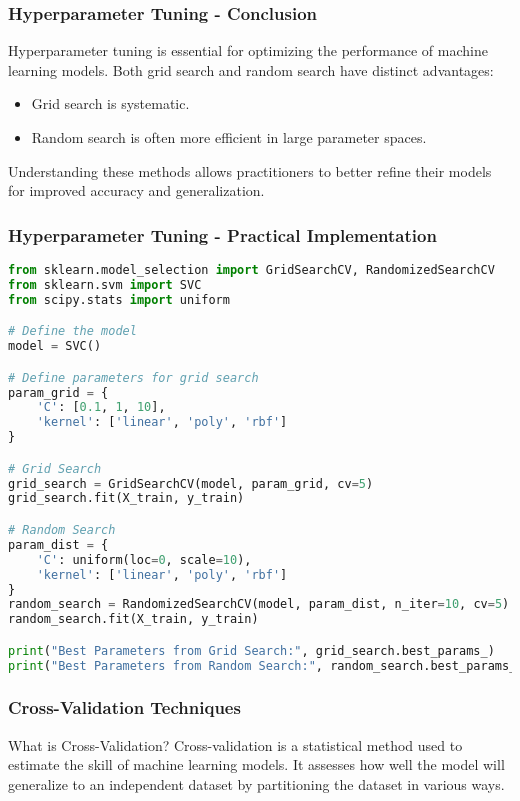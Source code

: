 \documentclass[aspectratio=169]{beamer}
\begin{document}
\begin{frame}[fragile]
    \frametitle{Hyperparameter Tuning - Conclusion}
    Hyperparameter tuning is essential for optimizing the performance of machine learning models. 
    Both grid search and random search have distinct advantages: 
    \begin{itemize}
        \item Grid search is systematic.
        \item Random search is often more efficient in large parameter spaces.
    \end{itemize}
    Understanding these methods allows practitioners to better refine their models for improved accuracy and generalization.
\end{frame}

\begin{frame}[fragile]
    \frametitle{Hyperparameter Tuning - Practical Implementation}
    \begin{lstlisting}[language=Python]
from sklearn.model_selection import GridSearchCV, RandomizedSearchCV
from sklearn.svm import SVC
from scipy.stats import uniform

# Define the model
model = SVC()

# Define parameters for grid search
param_grid = {
    'C': [0.1, 1, 10],
    'kernel': ['linear', 'poly', 'rbf']
}

# Grid Search
grid_search = GridSearchCV(model, param_grid, cv=5)
grid_search.fit(X_train, y_train)

# Random Search
param_dist = {
    'C': uniform(loc=0, scale=10),
    'kernel': ['linear', 'poly', 'rbf']
}
random_search = RandomizedSearchCV(model, param_dist, n_iter=10, cv=5)
random_search.fit(X_train, y_train)

print("Best Parameters from Grid Search:", grid_search.best_params_)
print("Best Parameters from Random Search:", random_search.best_params_)
    \end{lstlisting}
\end{frame}

\begin{frame}
    \frametitle{Cross-Validation Techniques}
    \begin{block}{What is Cross-Validation?}
        Cross-validation is a statistical method used to estimate the skill of machine learning models. It assesses how well the model will generalize to an independent dataset by partitioning the dataset in various ways.
    \end{block}
\end{frame}
\end{document}
